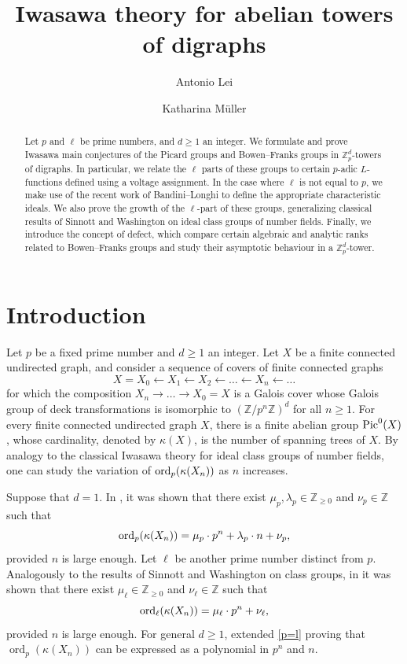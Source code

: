\documentclass[11pt]{amsart}
\title{Iwasawa theory for abelian towers of digraphs}
\author[A. Lei]{Antonio Lei}
\author[K. Müller]{Katharina Müller}
\DeclareMathOperator{\ord}{ord}
\numberwithin{equation}{section}
\theoremstyle{remark}
\newcommand{\?}{\stackrel{?}{=}}
\begin{document}
\begin{abstract}
Let $p$ and $\ell$ be prime numbers, and $d\ge1$ an integer. We formulate and prove Iwasawa main conjectures of the Picard groups and Bowen--Franks groups in $\mathbb{Z}_p^d$-towers of digraphs. In particular, we relate the $\ell$ parts of these groups to certain $p$-adic $L$-functions defined using a voltage assignment. In the case where $\ell$ is not equal to $p$, we make use of the recent work of Bandini--Longhi to define the appropriate characteristic ideals. We also prove the growth of the $\ell$-part of these groups, generalizing classical results of Sinnott and Washington on ideal class groups of number fields. Finally, we introduce the concept of defect, which compare certain algebraic and analytic ranks related to Bowen--Franks groups and study their asymptotic behaviour in a $\mathbb{Z}_p^d$-tower. 
\end{abstract}


\maketitle

\section{Introduction}
Let $p$ be a fixed prime number and $d\ge1$ an integer.  Let $X$ be a finite connected undirected graph, and consider a sequence of covers of finite connected graphs
$$X = X_{0} \leftarrow X_{1} \leftarrow X_{2} \leftarrow \ldots \leftarrow X_{n} \leftarrow \ldots $$
for which the composition $X_{n} \rightarrow \ldots \rightarrow X_{0} = X$ is a Galois cover whose Galois group of deck transformations is isomorphic to $(\mathbb{Z}/p^{n}\mathbb{Z})^d$ for all $n \ge 1$. For every finite connected undirected graph $X$, there is a finite abelian group ${\rm Pic}^{0}(X)$, whose cardinality, denoted by $\kappa(X)$, is the number of spanning trees of $X$.  By analogy to the classical Iwasawa theory for ideal class groups of number fields, one can study the variation of ${\rm ord}_{p}(\kappa(X_{n}))$ as $n$ increases. 

Suppose that $d=1$. In \cite{vallieres,vallieres2,vallieres3}, it was shown that there exist $\mu_{p},\lambda_{p} \in \mathbb{Z}_{\ge 0}$ and $\nu_{p} \in \mathbb{Z}$ such that
\begin{equation} \label{p=l}
{\rm ord}_{p}(\kappa(X_{n})) = \mu_{p} \cdot p^{n} + \lambda_{p} \cdot n + \nu_{p}, 
\end{equation}
provided $n$ is large enough.  Let $\ell$ be another prime number distinct from $p$.  Analogously to the results of Sinnott and Washington on class groups, in \cite{leivallieres} it was shown that there exist $\mu_{\ell} \in \mathbb{Z}_{\ge 0}$ and $\nu_{\ell} \in \mathbb{Z}$ such that
\begin{equation} \label{pn=l}
{\rm ord}_{\ell}(\kappa(X_{n})) = \mu_{\ell} \cdot p^{n} + \nu_{\ell},
\end{equation}
provided $n$ is large enough.
For general $d\ge1$, \cite{DV} extended \eqref{p=l} proving that $\ord_p(\kappa(X_{n}))$ can be expressed as a polynomial in $p^n$ and $n$.
\end{document}
